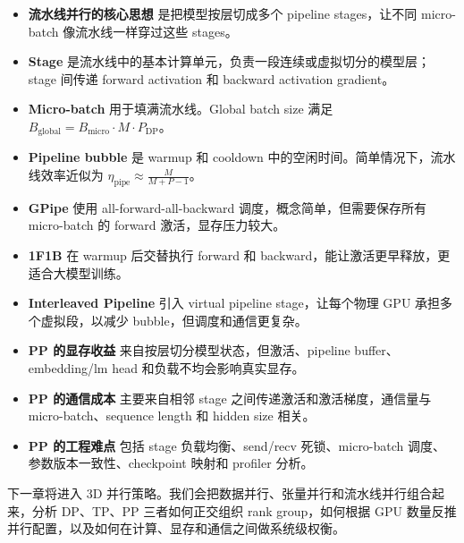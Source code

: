 \begin{itemize}
\item \textbf{流水线并行的核心思想} 是把模型按层切成多个 pipeline stages，让不同 micro-batch 像流水线一样穿过这些 stages。
\item \textbf{Stage} 是流水线中的基本计算单元，负责一段连续或虚拟切分的模型层；stage 间传递 forward activation 和 backward activation gradient。
\item \textbf{Micro-batch} 用于填满流水线。Global batch size 满足 $B_{\mathrm{global}}=B_{\mathrm{micro}}\cdot M\cdot P_{\mathrm{DP}}$。
\item \textbf{Pipeline bubble} 是 warmup 和 cooldown 中的空闲时间。简单情况下，流水线效率近似为 $\eta_{\mathrm{pipe}}\approx \frac{M}{M+P-1}$。
\item \textbf{GPipe} 使用 all-forward-all-backward 调度，概念简单，但需要保存所有 micro-batch 的 forward 激活，显存压力较大。
\item \textbf{1F1B} 在 warmup 后交替执行 forward 和 backward，能让激活更早释放，更适合大模型训练。
\item \textbf{Interleaved Pipeline} 引入 virtual pipeline stage，让每个物理 GPU 承担多个虚拟段，以减少 bubble，但调度和通信更复杂。
\item \textbf{PP 的显存收益} 来自按层切分模型状态，但激活、pipeline buffer、embedding/lm head 和负载不均会影响真实显存。
\item \textbf{PP 的通信成本} 主要来自相邻 stage 之间传递激活和激活梯度，通信量与 micro-batch、sequence length 和 hidden size 相关。
\item \textbf{PP 的工程难点} 包括 stage 负载均衡、send/recv 死锁、micro-batch 调度、参数版本一致性、checkpoint 映射和 profiler 分析。
\end{itemize}

下一章将进入 3D 并行策略。我们会把数据并行、张量并行和流水线并行组合起来，分析 DP、TP、PP 三者如何正交组织 rank group，如何根据 GPU 数量反推并行配置，以及如何在计算、显存和通信之间做系统级权衡。
